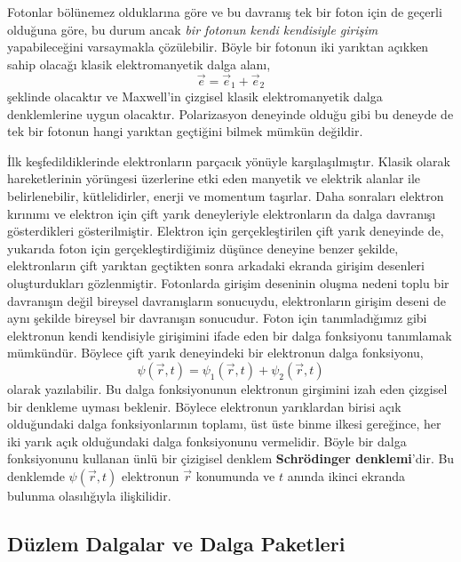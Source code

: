 \documentclass[a4paper,12pt, twoside]{article}
\begin{document}
Fotonlar bölünemez olduklarına göre ve bu davranış tek bir foton için de geçerli olduğuna göre, bu durum ancak \emph{bir fotonun kendi kendisiyle girişim} yapabileceğini varsaymakla çözülebilir. Böyle bir fotonun iki yarıktan açıkken sahip olacağı klasik elektromanyetik dalga alanı,
\begin{equation}
\vec e = \vec e_1 + \vec e_2
\label{eq:single_foton_em_field}
\end{equation}
şeklinde olacaktır ve Maxwell'in çizgisel klasik elektromanyetik dalga denklemlerine uygun olacaktır. Polarizasyon deneyinde olduğu gibi bu deneyde de tek bir fotonun hangi yarıktan geçtiğini bilmek mümkün değildir.


İlk keşfedildiklerinde elektronların parçacık yönüyle karşılaşılmıştır. Klasik olarak hareketlerinin yörüngesi üzerlerine etki eden manyetik ve elektrik alanlar ile belirlenebilir, kütlelidirler, enerji ve momentum taşırlar. Daha sonraları elektron kırınımı ve elektron için çift yarık deneyleriyle elektronların da dalga davranışı gösterdikleri gösterilmiştir. Elektron için gerçekleştirilen çift yarık deneyinde de, yukarıda foton için gerçekleştirdiğimiz düşünce deneyine benzer şekilde, elektronların çift yarıktan geçtikten sonra arkadaki ekranda girişim desenleri oluşturdukları gözlenmiştir. Fotonlarda girişim deseninin oluşma nedeni toplu bir davranışın değil bireysel davranışların sonucuydu, elektronların girişim deseni de aynı şekilde bireysel bir davranışın sonucudur. Foton için tanımladığımız gibi elektronun kendi kendisiyle girişimini ifade eden bir dalga fonksiyonu tanımlamak mümkündür. Böylece çift yarık deneyindeki bir elektronun dalga fonksiyonu,
\begin{equation}
\psi(\vec r, t) = \psi_1(\vec r, t) + \psi_2(\vec r, t)
\label{eq:single_electron_wave}
\end{equation}
olarak yazılabilir. Bu dalga fonksiyonunun elektronun girşimini izah eden çizgisel bir denkleme uyması beklenir. Böylece elektronun yarıklardan birisi açık olduğundaki dalga fonksiyonlarının toplamı, üst üste binme ilkesi gereğince, her iki yarık açık olduğundaki dalga fonksiyonunu vermelidir. Böyle bir dalga fonksiyonunu kullanan ünlü bir çizigisel denklem {\bf Schrödinger denklemi}'dir. Bu denklemde $\psi (\vec r, t)$ elektronun $\vec r$ konumunda ve $t$ anında ikinci ekranda bulunma olasılığıyla ilişkilidir. 

\subsection{Düzlem Dalgalar ve Dalga Paketleri}
\end{document}
